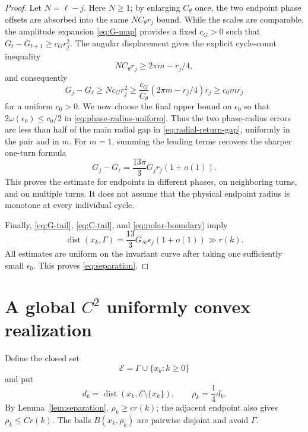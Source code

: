 \documentclass[smallextended,envcountsame]{svjour3}
\begin{document}
\begin{proof}
Let $N=\ell-j$.  Here $N\ge1$; by enlarging $C_\theta$ once, the two endpoint
phase offsets are absorbed into the same $NC_\theta r_j$ bound.  While the
scales are comparable, the amplitude expansion
\eqref{eq:G-map} provides a fixed $c_G>0$ such that
$G_t-G_{t+1}\ge c_G r_j^2$.  The angular displacement gives the explicit
cycle-count inequality
\begin{equation}\label{eq:cycle-count}
NC_\theta r_j\ge 2\pi m-r_j/4,
\end{equation}
and consequently
\begin{equation}\label{eq:radial-return-gap}
G_j-G_\ell
\ge Nc_G r_j^2
\ge \frac{c_G}{C_\theta}(2\pi m-r_j/4)r_j
\ge c_0m r_j
\end{equation}
for a uniform $c_0>0$.  We now choose the final upper bound on
$\epsilon_0$ so that $2\omega(\epsilon_0)\le c_0/2$ in
\eqref{eq:phase-radius-uniform}.  Thus the two phase-radius errors are less
than half of the main radial gap in \eqref{eq:radial-return-gap}, uniformly in
the pair and in $m$.  For $m=1$, summing the leading terms recovers the
sharper one-turn
formula
\begin{equation}\label{eq:one-turn-drop}
G_j-G_\ell=\frac{13\pi}{3}G_jr_j(1+o(1)).
\end{equation}
This proves the estimate for endpoints in different phases, on neighboring
turns, and on multiple turns.  It does not assume that the physical endpoint
radius is monotone at every individual cycle.

Finally, \eqref{eq:G-tail}, \eqref{eq:C-tail}, and
\eqref{eq:polar-boundary} imply
\[
\operatorname{dist}(x_k,\Gamma)
=\frac{13}{3}G_\infty\epsilon_j(1+o(1))\gg r(k).
\]
All estimates are uniform on the invariant curve after taking one sufficiently
small $\epsilon_0$.  This proves \eqref{eq:separation}.
\end{proof}

\section{A global \texorpdfstring{$C^2$}{C2} uniformly convex realization}
\label{sec:realization}

Define the closed set
\[
\mathcal E=\Gamma\cup\{x_k:k\ge0\}
\]
and put
\begin{equation}\label{eq:dk-rhok}
d_k=\operatorname{dist}(x_k,\mathcal E\setminus\{x_k\}),
\qquad \rho_k=\frac14d_k.
\end{equation}
By Lemma~\ref{lem:separation}, $\rho_k\ge c r(k)$; the adjacent endpoint
also gives $\rho_k\le Cr(k)$.  The balls $B(x_k,\rho_k)$ are pairwise
disjoint and avoid $\Gamma$.
\end{document}

